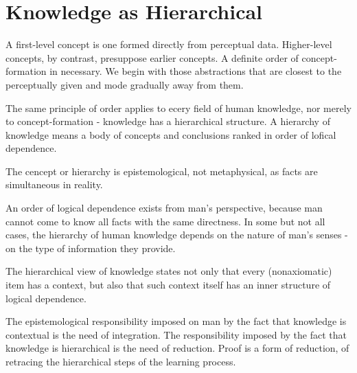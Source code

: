 
    \section{Knowledge as Hierarchical}

        A first-level concept is one formed directly from perceptual data. Higher-level concepts, by contrast, presuppose earlier concepts. A definite order of concept-formation in necessary. We begin with those abstractions that are closest to the perceptually given and mode gradually away from them.

        The same principle of order applies to ecery field of human knowledge, nor merely to concept-formation - knowledge has a hierarchical structure. A hierarchy of knowledge means a body of concepts and conclusions ranked in order of lofical dependence.


        The cencept or hierarchy is epistemological, not metaphysical, as facts are simultaneous in reality.

        An order of logical dependence exists from man's perspective, because man cannot come to know all facts with the same directness. In some but not all cases, the hierarchy of human knowledge depends on the nature of man's senses -  on the type of information they provide.

        The hierarchical view of knowledge states not only that every (nonaxiomatic) item has a context, but also that such context itself has an inner structure of logical dependence.

        The epistemological responsibility imposed on man by the fact that knowledge is contextual is the need of integration. The responsibility imposed by the fact that knowledge is hierarchical is the need of reduction. Proof is a form of reduction, of retracing the hierarchical steps of the learning process.

